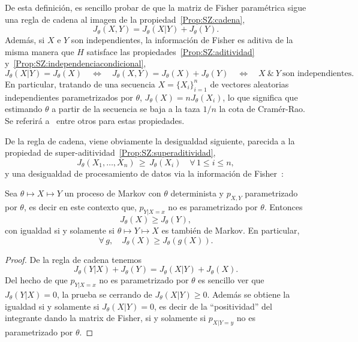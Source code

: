 De  esta  definici\'on,   es  sencillo  probar  de  que   la  matriz  de  Fisher
param\'etrica    sigue    una   regla    de    cadena    al    imagen   de    la
propiedad~\ref{Prop:SZ:cadena},
%
\[
J_\theta(X,Y) = J_\theta(X|Y) + J_\theta(Y).
\]
%
Adem\'as, si $X$ e $Y$ son independientes, la informaci\'on de Fisher es aditiva
de la  misma manera  que $H$ satisface  las propiedades~\ref{Prop:SZ:aditividad}
y~\ref{Prop:SZ:independenciacondicional}, \ie
%
\[
J_\theta(X|Y)  = J_\theta(X)  \quad \Leftrightarrow  \quad J_\theta(X,Y)  =  J_\theta(X) +
J_\theta(Y)   \quad  \Leftrightarrow   \quad  X   \:  \&   \:  Y   \:  \mbox{son
  independientes.}
\]
%
En particular,  tratando de una  secuencia $X =  \{ X_i \}_{i=1}^n$  de vectores
aleatorias  independientes   parametrizados  por  $\theta$,   $J_\theta(X)  =  n
J_\theta(X_i)$, lo que significa que estimando $\theta$ a partir de la secuencia
se   baja  a   la  taza   $1/n$  la   cota  de   Cram\'er-Rao.    Se  referir\'a
a~\cite{Fis25:07, Sta59,  Kay93, KagSmi99,  Joh04, CovTho06, Rio07}  entre otros
para estas propiedades.

De la regla de cadena, viene  obviamente la desigualdad siguiente, parecida a la
propiedad de super-aditividad~\ref{Prop:SZ:superaditividad},
%
\[
J_\theta(X_1,\ldots,X_n) \, \ge \,  J_\theta(X_i) \quad \forall \, 1 \le i \le n,
\]
%
y  una   desigualdad  de  procesamiento   de  datos  via  la   informaci\'on  de
Fisher~\cite{Zam98, Rio07, CovTho06, Fri04, KagSmi99}:
%
\begin{teorema}
\label{Teo:SZ:DesigualdadProcesamientoDatosFisher}
%
  Sea  $\theta  \mapsto  X  \mapsto   Y$  un  proceso  de  Markov  con  $\theta$
  determinista y $p_{X,Y}$ parametrizado por $\theta$, es decir en este contexto
  que, $p_{Y|X=x}$ no es parametrizado por $\theta$. Entonces
  \[
  J_\theta(X) \ge J_\theta(Y),
  \]
  con igualdad si y solamente si $\theta \mapsto Y \mapsto X$ es tambi\'en
  de Markov. En  particular,
  \[
  \forall \, g, \quad J_\theta(X) \ge J_\theta(g(X)).
  \]
\end{teorema}
%
\begin{proof}
  De la regla de cadena tenemos
  \[
  J_\theta(Y|X) + J_\theta(Y) = J_\theta(X|Y) + J_\theta(X).
  \]
  Del hecho de que $p_{Y|X=x}$ no  es parametrizado por $\theta$ es sencillo ver
  que  $J_\theta(Y|X)  =  0$,  la  prueba  se  cerrando  de  $J_\theta(X|Y)  \ge
  0$. Adem\'as se obtiene la igualdad  si y solamente si $J_\theta(X|Y) = 0$, es
  decir de  la ``positividad'' del  integrante dando la  matrix de Fisher,  si y
  solamente si $p_{X|Y=y}$ no es parametrizado por $\theta$.
\end{proof}

